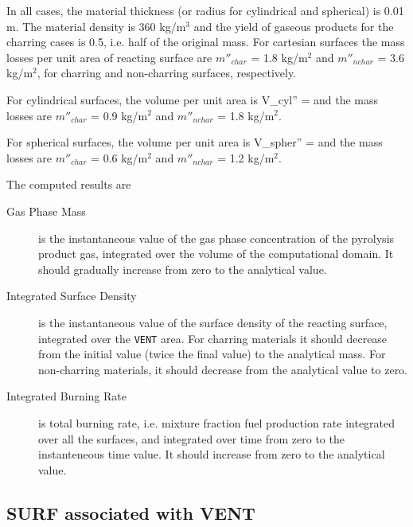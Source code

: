 \documentclass[11pt]{book}
\newcommand{\ct}{\tt\small}
\begin{document}
In all cases, the material thickness (or radius for cylindrical and spherical) is 0.01 m. The material density is 360 kg/m$^3$ and the yield of gaseous
products for the charring cases is 0.5, i.e. half of the original mass. For cartesian surfaces the mass losses per unit area of reacting surface are
$m''_{char}$ = 1.8 kg/m$^2$ and $m''_{nchar}$ = 3.6 kg/m$^2$, for charring and non-charring surfaces, respectively.

For cylindrical surfaces, the volume per unit
area is
\be
V_{cyl}'' = 
\ee
and the mass losses are $m''_{char}$ = 0.9 kg/m$^2$ and $m''_{nchar}$ = 1.8 kg/m$^2$.

For spherical surfaces, the volume per unit area is
\be
V_{spher}'' = 
\ee
and the mass losses are $m''_{char}$ = 0.6 kg/m$^2$ and $m''_{nchar}$ = 1.2 kg/m$^2$.

The computed results are
\begin{description}
\item[Gas Phase Mass] is the instantaneous value of the gas phase concentration of the pyrolysis product gas, integrated over the volume of the
computational domain. It should gradually increase from zero to the analytical value.
\item[Integrated Surface Density] is the instantaneous value of the surface density of the reacting surface, integrated over the {\ct VENT} area.
For charring materials it should decrease from the initial value (twice the final value) to the analytical mass. For non-charring materials, it should
decrease from the analytical value to zero.
\item[Integrated Burning Rate] is total burning rate, i.e. mixture fraction fuel production rate integrated over all the surfaces, and integrated over time
from zero to the instanteneous time value. It should increase from zero to the analytical value.
\end{description}


\subsection{SURF associated with VENT}
\end{document}
